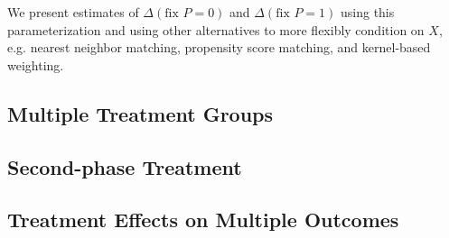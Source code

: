 \noindent We present estimates of $\Delta \left( \text{fix } P = 0 \right)$ and $\Delta \left( \text{fix } P = 1 \right)$ using this parameterization and using other alternatives to more flexibly  condition on $X$, e.g. nearest neighbor matching, propensity score matching, and kernel-based weighting.

\subsection{Multiple Treatment Groups}

\subsection{Second-phase Treatment}

\subsection{Treatment Effects on Multiple Outcomes}

\clearpage
\singlespace



 